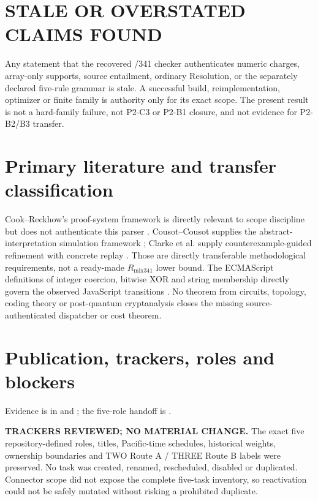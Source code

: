 \documentclass[11pt]{article}
\begin{document}
\section*{STALE OR OVERSTATED CLAIMS FOUND}
Any statement that the recovered /341 checker authenticates numeric charges, array-only supports, source entailment, ordinary Resolution, or the separately declared five-rule grammar is stale.  A successful build, reimplementation, optimizer or finite family is authority only for its exact scope.  The present result is not a hard-family failure, not P2-C3 or P2-B1 closure, and not evidence for P2-B2/B3 transfer.

\section*{Primary literature and transfer classification}
Cook--Reckhow's proof-system framework is directly relevant to scope discipline but does not authenticate this parser \cite{CR79}.  Cousot--Cousot supplies the abstract-interpretation simulation framework \cite{CC77}; Clarke et al. supply counterexample-guided refinement with concrete replay \cite{CEGAR00}.  Those are directly transferable methodological requirements, not a ready-made \(R_{\mathrm{mix341}}\) lower bound.  The ECMAScript definitions of integer coercion, bitwise XOR and string membership directly govern the observed JavaScript transitions \cite{ECMA}.  No theorem from circuits, topology, coding theory or post-quantum cryptanalysis closes the missing source-authenticated dispatcher or cost theorem.

\section*{Publication, trackers, roles and blockers}
Evidence is in
 and
; the five-role handoff is
.

\textbf{TRACKERS REVIEWED; NO MATERIAL CHANGE.}  The exact five repository-defined roles, titles, Pacific-time schedules, historical weights, ownership boundaries and TWO Route A / THREE Route B labels were preserved.  No task was created, renamed, rescheduled, disabled or duplicated.  Connector scope did not expose the complete five-task inventory, so reactivation could not be safely mutated without risking a prohibited duplicate.
\end{document}
